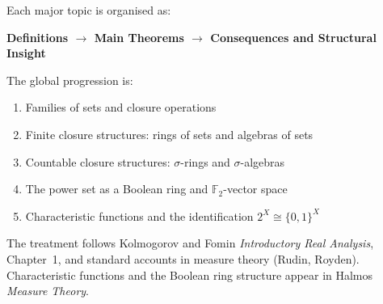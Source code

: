 Each major topic is organised as:
\begin{center}
\textbf{Definitions $\longrightarrow$ Main Theorems
$\longrightarrow$ Consequences and Structural Insight}
\end{center}

The global progression is:
\begin{enumerate}
  \item Families of sets and closure operations
  \item Finite closure structures: rings of sets and algebras of sets
  \item Countable closure structures: $\sigma$-rings and $\sigma$-algebras
  \item The power set as a Boolean ring and $\mathbb{F}_2$-vector space
  \item Characteristic functions and the identification $2^X \cong \{0,1\}^X$
\end{enumerate}

\begin{remark}
The treatment follows Kolmogorov and Fomin \textit{Introductory Real Analysis},
Chapter~1, and standard accounts in measure theory (Rudin, Royden).
Characteristic functions and the Boolean ring structure appear in Halmos
\textit{Measure Theory}.
\end{remark}




% 
% 